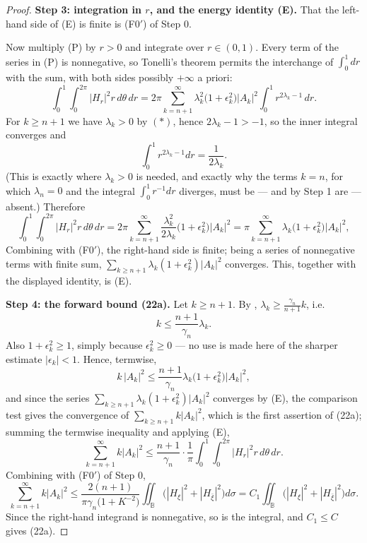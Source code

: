 \begin{proof}
\medskip\noindent\textbf{Step 3: integration in $r$, and the energy identity (E).}
That the left-hand side of (E) is finite is (F0$'$) of Step 0.

Now multiply (P) by $r>0$ and integrate over $r\in(0,1)$.  Every term of the
series in (P) is nonnegative, so Tonelli's theorem permits the interchange of
$\int_0^1dr$ with the sum, with both sides possibly $+\infty$ a priori:
\[
  \int_0^1\!\!\int_0^{2\pi}\bigl|H_r\bigr|^2r\,d\theta\,dr
  =2\pi\sum_{k=n+1}^{\infty}\lambda_k^2\bigl(1+\epsilon_k^2\bigr)|A_k|^2
    \int_0^1r^{2\lambda_k-1}\,dr .
\]
For $k\ge n+1$ we have $\lambda_k>0$ by $(\ast)$, hence $2\lambda_k-1>-1$, so
the inner integral converges and
\[
  \int_0^1r^{2\lambda_k-1}dr=\frac{1}{2\lambda_k}.
\]
(This is exactly where $\lambda_k>0$ is needed, and exactly why the terms
$k=n$, for which $\lambda_n=0$ and the integral $\int_0^1r^{-1}dr$ diverges,
must be --- and by Step 1 are --- absent.)  Therefore
\[
  \int_0^1\!\!\int_0^{2\pi}\bigl|H_r\bigr|^2r\,d\theta\,dr
  =2\pi\sum_{k=n+1}^{\infty}\frac{\lambda_k^2}{2\lambda_k}
    \bigl(1+\epsilon_k^2\bigr)|A_k|^2
  =\pi\sum_{k=n+1}^{\infty}\lambda_k\bigl(1+\epsilon_k^2\bigr)|A_k|^2,
\]
Combining with (F0$'$), the right-hand side is finite; being a series of
nonnegative terms with finite sum, $\sum_{k\ge n+1}\lambda_k(1+\epsilon_k^2)|A_k|^2$
converges.  This, together with the displayed identity, is (E).

\medskip\noindent\textbf{Step 4: the forward bound (22a).}  Let $k\ge n+1$.  By
,
$\lambda_k\ge\frac{\gamma_n}{n+1}k$, i.e.
\[
  k\le\frac{n+1}{\gamma_n}\lambda_k .
\]
Also $1+\epsilon_k^2\ge1$, simply because $\epsilon_k^2\ge0$ --- no use is made
here of the sharper estimate $|\epsilon_k|<1$.  Hence, termwise,
\[
  k\,|A_k|^2\le\frac{n+1}{\gamma_n}\lambda_k\bigl(1+\epsilon_k^2\bigr)|A_k|^2,
\]
and since the series $\sum_{k\ge n+1}\lambda_k(1+\epsilon_k^2)|A_k|^2$ converges
by (E), the comparison test gives the convergence of $\sum_{k\ge n+1}k|A_k|^2$,
which is the first assertion of (22a); summing the termwise inequality and
applying (E),
\begin{equation}\tag{F1}
  \sum_{k=n+1}^{\infty}k|A_k|^2
  \le\frac{n+1}{\gamma_n}\cdot\frac1\pi
    \int_0^1\!\!\int_0^{2\pi}\bigl|H_r\bigr|^2r\,d\theta\,dr .
\end{equation}
Combining with (F0$'$) of Step 0,
\[
  \sum_{k=n+1}^{\infty}k|A_k|^2
  \le\frac{2(n+1)}{\pi\gamma_n\bigl(1+K^{-2}\bigr)}
    \iint_{\mathbb{B}}\bigl(|H_\xi|^2+|H_{\bar\xi}|^2\bigr)d\sigma
  =C_1\iint_{\mathbb{B}}\bigl(|H_\xi|^2+|H_{\bar\xi}|^2\bigr)d\sigma .
\]
Since the right-hand integrand is nonnegative, so is the integral, and
$C_1\le C$ gives (22a).


\end{proof}
